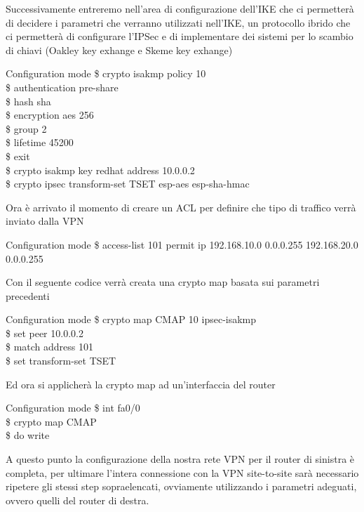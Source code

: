 Successivamente entreremo nell’area di configurazione dell’IKE che ci permetterà di decidere i parametri che verranno utilizzati nell’IKE, un protocollo ibrido che ci permetterà di configurare l’IPSec e di implementare dei sistemi per lo scambio di chiavi (Oakley key exhange e Skeme key exhange)

\begin{fcmds}{Configuration mode}
    \$ crypto isakmp policy 10\\
    \$ authentication pre-share\\
    \$ hash sha\\
    \$ encryption aes 256\\
    \$ group 2\\
    \$ lifetime 45200\\
    \$ exit\\
    \$ crypto isakmp key redhat address 10.0.0.2\\
    \$ crypto ipsec transform-set TSET esp-aes esp-sha-hmac
\end{fcmds}

Ora è arrivato il momento di creare un ACL per definire che tipo di traffico verrà inviato dalla VPN

\begin{fcmds}{Configuration mode}
    \$ access-list 101 permit ip 192.168.10.0 0.0.0.255 192.168.20.0 0.0.0.255
\end{fcmds}

Con il seguente codice verrà creata una crypto map basata sui parametri precedenti

\begin{fcmds}{Configuration mode}
    \$ crypto map CMAP 10 ipsec-isakmp\\
    \$ set peer 10.0.0.2\\
    \$ match address 101\\
    \$ set transform-set TSET
\end{fcmds}

Ed ora si applicherà la crypto map ad un’interfaccia del router

\begin{fcmds}{Configuration mode}
    \$ int fa0/0\\
    \$ crypto map CMAP\\
    \$ do write
\end{fcmds}

A questo punto la configurazione della nostra rete VPN per il router di sinistra è completa, per ultimare l’intera connessione con la VPN site-to-site sarà necessario ripetere gli stessi step sopraelencati, ovviamente utilizzando i parametri adeguati, ovvero quelli del router di destra.

